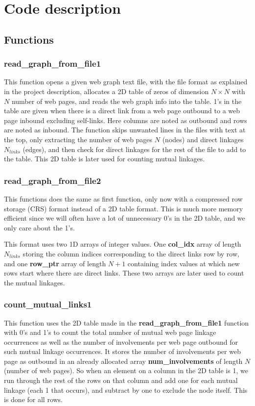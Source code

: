 \documentclass[12pt,a4paper,english]{article}
\begin{document}
\section{Code description}
\label{sect:Code_descr}
\subsection{Functions}
\label{subsect:Functions}
\subsubsection{read\_graph\_from\_file1}
This function opens a given web graph text file, with the file format as explained in the project description, allocates a 2D table of zeros of dimension $N\times N$ with $N$ number of web pages, and reads the web graph info into the table. 1's in the table are given when there is a direct link from a web page outbound to a web page inbound excluding self-links. Here columns are noted as outbound and rows are noted as inbound. The function skips unwanted lines in the files with text at the top, only extracting the number of web pages $N$ (nodes) and direct linkages $N_{links}$ (edges), and then check for direct linkages for the rest of the file to add to the table. This 2D table is later used for counting mutual linkages.

\subsubsection{read\_graph\_from\_file2}
This functions does the same as first function, only now with a compressed row storage (CRS) format instead of a 2D table format. This is much more memory efficient since we will often have a lot of unnecessary 0's in the 2D table, and we only care about the 1's. 

This format uses two 1D arrays of integer values. One \textbf{col\_idx} array of length $N_{links}$ storing the column indices corresponding to the direct links row by row, and one \textbf{row\_ptr} array of length $N+1$ containing index values at which new rows start where there are direct links. These two arrays are later used to count the mutual linkages.

\subsubsection{count\_mutual\_links1}
This function uses the 2D table made in the \textbf{read\_graph\_from\_file1} function with 0's and 1's to count the total number of mutual web page linkage occurrences as well as the number of involvements per web page outbound for such mutual linkage occurrences. It stores the number of involvements per web page as outbound in an already allocated array \textbf{num\_involvements} of length $N$ (number of web pages). So when an element on a column in the 2D table is 1, we run through the rest of the rows on that column and add one for each mutual linkage (each 1 that occurs), and subtract by one to exclude the node itself. This is done for all rows.
\end{document}
